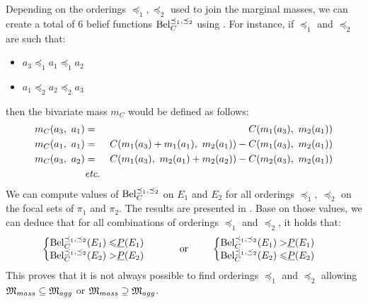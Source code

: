 \begin{example}
Depending on the orderings $\preceq_1, \preceq_2$ used to join the marginal masses, we can create a total of 6 belief functions $\mathrm{Bel}^{\preceq_1,\preceq_2}_C$ using . For instance, if $\preceq_1$ and $\preceq_2$ are such that:
\begin{itemize}
    \item $a_3\preceq_1 a_1 \preceq_1 a_2$
    \item $a_1 \preceq_2 a_2 \preceq_2 a_3$
\end{itemize}
then the bivariate mass $m_C$ would be defined as follows:
\begin{eqnarray*}
    m_C(a_3, ~a_1) &=& C(m_1(a_3), ~m_2(a_1))\\
    m_C(a_1, ~a_1) &=& C(m_1(a_3)+m_1(a_1), ~m_2(a_1)) - C(m_1(a_3), ~m_2(a_1))\\
    m_C(a_3, ~a_2) &=& C(m_1(a_3), ~m_2(a_1) + m_2(a_2)) - C(m_2(a_3), ~m_2(a_1))\\
    &\etc&
\end{eqnarray*}
We can compute values of $\mathrm{Bel}_C^{\preceq_1,\preceq_2}$ on $E_1$ and $E_2$ for all orderings $\preceq_1,~\preceq_2$ on the focal sets of $\pi_1$ and $\pi_2$. The results are presented in  . Base on those values, we can deduce that for all combinations of orderings $\preceq_1$ and $\preceq_2$, it holds that:
 \begin{align*}
    \begin{cases}
        \begin{split}
            \mathrm{Bel}_C^{\preceq_1,\preceq_2}(E_1) \leqslant& \underline{P}(E_1)\\
            \mathrm{Bel}_C^{\preceq_1,\preceq_2}(E_2) >& \underline{P}(E_2)
        \end{split}
    \end{cases}
    \qquad\text{ or }\qquad
    \begin{cases}
        \begin{split}
            \mathrm{Bel}_C^{\preceq_1,\preceq_2}(E_1) >& \underline{P}(E_1)\\
            \mathrm{Bel}_C^{\preceq_1,\preceq_2}(E_2) \leqslant& \underline{P}(E_2)
        \end{split}
    \end{cases}
\end{align*}
This proves that it is not always possible to find orderings $\preceq_1$ and $\preceq_2$ allowing $\mathfrak{M}_{mass}\subseteq\mathfrak{M}_{agg}$ or $\mathfrak{M}_{mass}\supseteq\mathfrak{M}_{agg}$.


\end{example}
